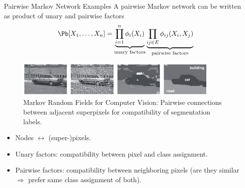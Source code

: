 \begin{frame}{Pairwise Markov Network Examples}
    A pairwise Markov network can be written as product of unary and pairwise factors
\begin{equation}
    \Pb[X_1,\ldots,X_n] = \underbrace{\prod_{i=1}^n \phi_i(X_i)}_{\text{unary factors}} \underbrace{\prod_{ij \in E} \phi_{ij}(X_i,X_j)}_{\text{pairwise factors}}
\end{equation}
\pause

\begin{example}
\begin{center}
    \begin{figure}
\includegraphics[width=0.9\textwidth]{img/Markov-network-computer-vision.png}
    \caption{Markov Random Fields for Computer Vision: Pairwise connections between adjacent superpixels for compatibility of segmentation labels.}
    \end{figure}
\end{center}
\begin{itemize}
    \item Nodes $\leftrightarrow$ (super-)pixels.
\item Unary factors: compatibility between pixel and class assignment.
\item Pairwise factors: compatibility between neighboring pixels (are they similar $\Rightarrow$ prefer same class assignment of both).
\end{itemize}
\end{example}
\end{frame}


